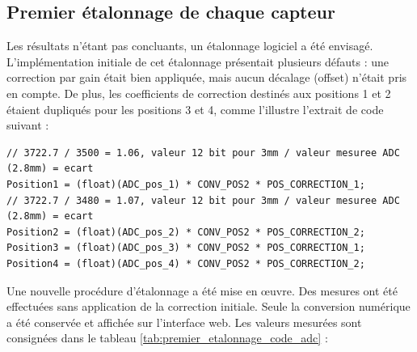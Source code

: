 \subsection{Premier étalonnage de chaque capteur}
Les résultats n'étant pas concluants, un étalonnage logiciel a été envisagé. L'implémentation initiale de cet étalonnage présentait plusieurs défauts : une correction par gain était bien appliquée, mais aucun décalage (offset) n'était pris en compte. De plus, les coefficients de correction destinés aux positions 1 et 2 étaient dupliqués pour les positions 3 et 4, comme l'illustre l'extrait de code suivant :

\begin{verbatim}
// 3722.7 / 3500 = 1.06, valeur 12 bit pour 3mm / valeur mesuree ADC (2.8mm) = ecart
Position1 = (float)(ADC_pos_1) * CONV_POS2 * POS_CORRECTION_1;
// 3722.7 / 3480 = 1.07, valeur 12 bit pour 3mm / valeur mesuree ADC (2.8mm) = ecart
Position2 = (float)(ADC_pos_2) * CONV_POS2 * POS_CORRECTION_2;
Position3 = (float)(ADC_pos_3) * CONV_POS2 * POS_CORRECTION_1;
Position4 = (float)(ADC_pos_4) * CONV_POS2 * POS_CORRECTION_2;
\end{verbatim}

Une nouvelle procédure d'étalonnage a été mise en œuvre. Des mesures ont été effectuées sans application de la correction initiale. Seule la conversion numérique a été conservée et affichée sur l'interface web. Les valeurs mesurées sont consignées dans le tableau \ref{tab:premier_etalonnage_code_adc} :


